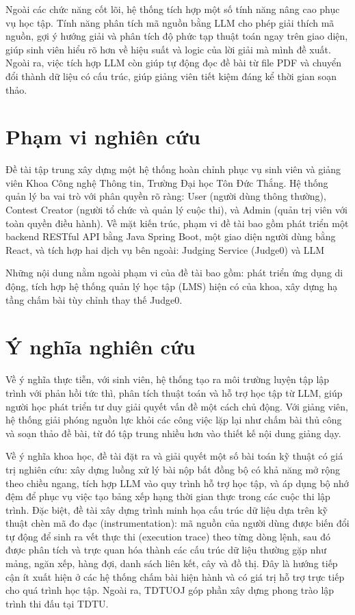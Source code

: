\documentclass[12pt, a4paper]{report}
\begin{document}
Ngoài các chức năng cốt lõi, hệ thống tích hợp một số tính năng nâng cao phục vụ học tập.
Tính năng phân tích mã nguồn bằng \ac{LLM} cho phép giải thích mã nguồn, gợi ý hướng giải
và phân tích độ phức tạp thuật toán ngay trên giao diện, giúp sinh viên hiểu rõ hơn về
hiệu suất và logic của lời giải mà mình đề xuất. Ngoài ra, việc tích hợp LLM còn giúp
tự động đọc đề bài từ file \ac{PDF} và chuyển đổi thành dữ liệu có cấu trúc,
giúp giảng viên tiết kiệm đáng kể thời gian soạn thảo.

\section{Phạm vi nghiên cứu}

Đề tài tập trung xây dựng một hệ thống hoàn chỉnh phục vụ sinh viên và giảng viên Khoa
Công nghệ Thông tin, Trường Đại học Tôn Đức Thắng. Hệ thống quản lý ba vai trò với phân
quyền rõ ràng: User (người dùng thông thường), Contest Creator (người tổ chức và quản lý
cuộc thi), và Admin (quản trị viên với toàn quyền điều hành). Về mặt kiến trúc, phạm vi đề
tài bao gồm phát triển một backend \ac{REST}ful \ac{API} bằng Java Spring Boot, một giao
diện người dùng bằng React, và tích hợp hai dịch vụ bên ngoài: Judging Service (Judge0) và
\ac{LLM}

Những nội dung nằm ngoài phạm vi của đề tài bao gồm: phát triển ứng dụng di động, tích hợp
hệ thống quản lý học tập (LMS) hiện có của khoa, xây dựng hạ tầng chấm bài tùy chỉnh
thay thế Judge0.

\section{Ý nghĩa nghiên cứu}

Về ý nghĩa thực tiễn, với sinh viên, hệ thống tạo ra môi trường luyện tập lập trình với
phản hồi tức thì, phân tích thuật toán và hỗ trợ học tập từ \ac{LLM}, giúp người học phát
triển tư duy giải quyết vấn đề một cách chủ động. Với giảng viên, hệ thống giải phóng
nguồn lực khỏi các công việc lặp lại như chấm bài thủ công và soạn thảo đề bài, từ đó tập
trung nhiều hơn vào thiết kế nội dung giảng dạy.

Về ý nghĩa khoa học, đề tài đặt ra và giải quyết một số bài toán kỹ thuật có giá trị nghiên 
cứu: xây dựng luồng xử lý bài nộp bất đồng bộ có khả năng mở rộng theo chiều ngang, tích hợp 
\ac{LLM} vào quy trình hỗ trợ học tập, và áp dụng bộ nhớ đệm để phục vụ việc tạo bảng xếp hạng thời 
gian thực trong các cuộc thi lập trình. Đặc biệt, đề tài xây dựng trình minh họa cấu trúc dữ liệu dựa trên kỹ thuật chèn mã 
đo đạc (instrumentation): mã nguồn của người dùng được biến đổi tự động để sinh ra vết thực thi 
(execution trace) theo từng dòng lệnh, sau đó được phân tích và trực quan hóa thành các cấu trúc dữ 
liệu thường gặp như mảng, ngăn xếp, hàng đợi, danh sách liên kết, cây và đồ thị. 
Đây là hướng tiếp cận ít xuất hiện ở các hệ thống chấm bài hiện hành và có giá trị hỗ trợ
trực tiếp cho quá trình học tập. Ngoài ra, TDTUOJ góp phần xây dựng phong trào lập trình thi đấu tại \ac{TDTU}.
\end{document}
